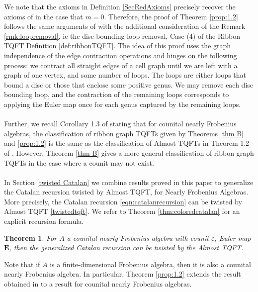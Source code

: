 \documentclass{amsart}
\newcommand{\eps}{\varepsilon}
\newcommand{\bige}{\mathbf{E}}
\newtheorem{Thm}[Lem]{Theorem}
\theoremstyle{definition}
\begin{document}
\noindent We note that the axioms in Definition \ref{SecRedAxioms} precisely recover the axioms of \cite{DM_ribbon} in the case that $m=0$. Therefore, the proof of Theorem \ref{prop:1.2} follows the same arguments of \cite{DM_ribbon} with the additional consideration of the Remark \ref{rmk:loopremoval}, ie the disc-bounding loop removal, Case (4) of the Ribbon TQFT Definition \ref{def:ribbonTQFT}. The idea of this proof uses the graph independence of the edge contraction operations and hinges on the following process: we contract all straight edges of a cell graph until we are left with a graph of one vertex, and some number of loops. The loops are either loops that bound a disc or those that enclose some positive genus. We may remove each disc bounding loop, and the contraction of the remaining loops corresponds to applying the Euler map once for each genus captured by the remaining loops.\\
\\
\noindent Further, we recall Corollary 1.3 of \cite{DaDu} stating that for counital nearly Frobenius algebras, the classification of ribbon graph TQFTs given by Theorems \ref{thm B} and \ref{prop:1.2} is the same as the classification of Almost TQFTs in Theorem 1.2 of \cite{DaDu}. However, Theorem \ref{thm B} gives a more general classification of ribbon graph TQFTs in the case where a counit may not exist.\\
\\
\noindent In Section \ref{twisted Catalan} we combine results proved in this paper to generalize the Catalan recursion twisted by Almost TQFT, for Nearly Frobenius Algebras.  More precisely, the Catalan recursion \ref{eqn:catalanrecursion} can be twisted by Almost TQFT \ref{twistedtqft}. We refer to Theorem \ref{thm:coloredcatalan} for an explicit recursion formula.

\begin{Thm}\label{thm:nearlycatalantwist}
For $A$  a counital nearly Frobenius algebra with counit $\eps$, Euler map $\bige$, then the generalized Catalan recursion can be twisted by the Almost TQFT. 
	
\end{Thm}


\noindent Note that if $A$ is a finite-dimensional Frobenius algebra, then it is also a counital nearly Frobenius algebra. In particular, Theorem \ref{prop:1.2}  extends the result obtained in \cite{DM_ribbon} to a result for counital nearly Frobenius algebras.
\end{document}
